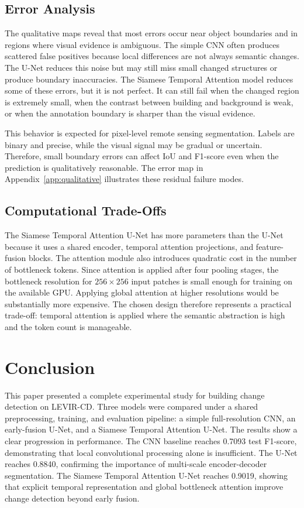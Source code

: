 \documentclass[11pt,a4paper]{article}
\begin{document}
\subsection{Error Analysis}

The qualitative maps reveal that most errors occur near object boundaries and in regions where visual evidence is ambiguous. The simple CNN often produces scattered false positives because local differences are not always semantic changes. The U-Net reduces this noise but may still miss small changed structures or produce boundary inaccuracies. The Siamese Temporal Attention model reduces some of these errors, but it is not perfect. It can still fail when the changed region is extremely small, when the contrast between building and background is weak, or when the annotation boundary is sharper than the visual evidence.

This behavior is expected for pixel-level remote sensing segmentation. Labels are binary and precise, while the visual signal may be gradual or uncertain. Therefore, small boundary errors can affect IoU and F1-score even when the prediction is qualitatively reasonable. The error map in Appendix~\ref{app:qualitative} illustrates these residual failure modes.

\subsection{Computational Trade-Offs}

The Siamese Temporal Attention U-Net has more parameters than the U-Net because it uses a shared encoder, temporal attention projections, and feature-fusion blocks. The attention module also introduces quadratic cost in the number of bottleneck tokens. Since attention is applied after four pooling stages, the bottleneck resolution for $256 \times 256$ input patches is small enough for training on the available GPU. Applying global attention at higher resolutions would be substantially more expensive. The chosen design therefore represents a practical trade-off: temporal attention is applied where the semantic abstraction is high and the token count is manageable.

\section{Conclusion}
\label{sec:conclusion}

This paper presented a complete experimental study for building change detection on LEVIR-CD. Three models were compared under a shared preprocessing, training, and evaluation pipeline: a simple full-resolution CNN, an early-fusion U-Net, and a Siamese Temporal Attention U-Net. The results show a clear progression in performance. The CNN baseline reaches 0.7093 test F1-score, demonstrating that local convolutional processing alone is insufficient. The U-Net reaches 0.8840, confirming the importance of multi-scale encoder-decoder segmentation. The Siamese Temporal Attention U-Net reaches 0.9019, showing that explicit temporal representation and global bottleneck attention improve change detection beyond early fusion.
\end{document}
